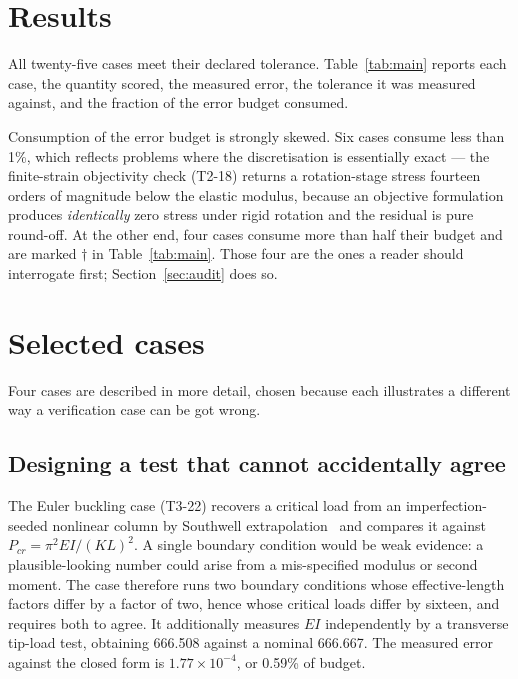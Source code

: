 \documentclass[11pt,a4paper]{article}
\begin{document}
\section{Results}
\label{sec:results}

All twenty-five cases meet their declared tolerance. Table~\ref{tab:main} reports
each case, the quantity scored, the measured error, the tolerance it was
measured against, and the fraction of the error budget consumed.

Consumption of the error budget is strongly skewed. Six cases consume less than
1\%, which reflects problems where the discretisation is essentially exact ---
the finite-strain objectivity check (T2-18) returns a rotation-stage stress
fourteen orders of magnitude below the elastic modulus, because an objective
formulation produces \emph{identically} zero stress under rigid rotation and the
residual is pure round-off. At the other end, four cases consume more than half
their budget and are marked $\dagger$ in Table~\ref{tab:main}. Those four are the
ones a reader should interrogate first; Section~\ref{sec:audit} does so.



\section{Selected cases}

Four cases are described in more detail, chosen because each illustrates a
different way a verification case can be got wrong.

\subsection{Designing a test that cannot accidentally agree}
\label{sec:buckling}
The Euler buckling case (T3-22) recovers a critical load from an
imperfection-seeded nonlinear column by Southwell extrapolation~\cite{southwell1932}
and compares it against $P_{cr} = \pi^2 EI/(KL)^2$. A single boundary condition
would be weak evidence: a plausible-looking number could arise from a
mis-specified modulus or second moment. The case therefore runs two boundary
conditions whose effective-length factors differ by a factor of two, hence whose
critical loads differ by sixteen, and requires both to agree. It additionally
measures $EI$ independently by a transverse tip-load test, obtaining 666.508
against a nominal 666.667. The measured error against the closed form is
$1.77\times10^{-4}$, or 0.59\% of budget.
\end{document}
